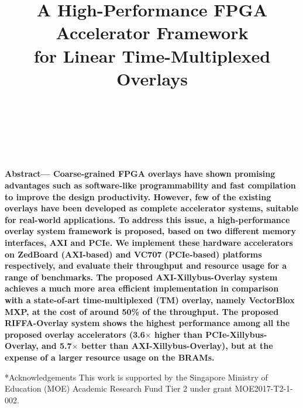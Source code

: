 \documentclass[twocolumn]{article}
\makeatletter
\def\section{\@startsection {section}{1}{\z@}{20pt plus 2pt minus 2pt}
{8pt plus 2pt minus 2pt}{\centering\normalsize\sc
\edef\@svsec{\thesection.\ }}}
\def\thesection{\Roman{section}}
\makeatother
\begin{document}
\date{}

\title{\Large\textbf{A High-Performance FPGA Accelerator Framework\\ for Linear Time-Multiplexed Overlays}\\~\\
}


\author{
\\ %
}
\maketitle
\thispagestyle{empty}

{\small\textbf{Abstract---
Coarse-grained FPGA overlays have shown promising advantages such as software-like programmability and fast compilation to improve the design productivity. 
However, few of the existing overlays have been developed as complete accelerator systems, suitable for real-world applications. 
To address this issue, a high-performance overlay system framework is proposed, based on two different memory interfaces, AXI and PCIe. 
We implement these hardware accelerators on ZedBoard (AXI-based) and VC707 (PCIe-based) platforms respectively, and evaluate their throughput and resource usage for a range of benchmarks. 
The proposed AXI-Xillybus-Overlay system achieves a much more area efficient implementation in comparison with a state-of-art time-multiplexed (TM) overlay, namely VectorBlox MXP, at the cost of around 50\% of the throughput.
The proposed RIFFA-Overlay system shows the highest performance among all the proposed overlay accelerators (3.6$\times$ higher than PCIe-Xillybus-Overlay, and 5.7$\times$ better than AXI-Xillybus-Overlay), but at the expense of a larger resource usage on the BRAMs. 
}}









\section*{\sc Acknowledgements}
This work is supported by the Singapore Ministry of Education (MOE) Academic Research Fund Tier 2 under grant MOE2017-T2-1-002.


\footnotesize{
}
\end{document}
